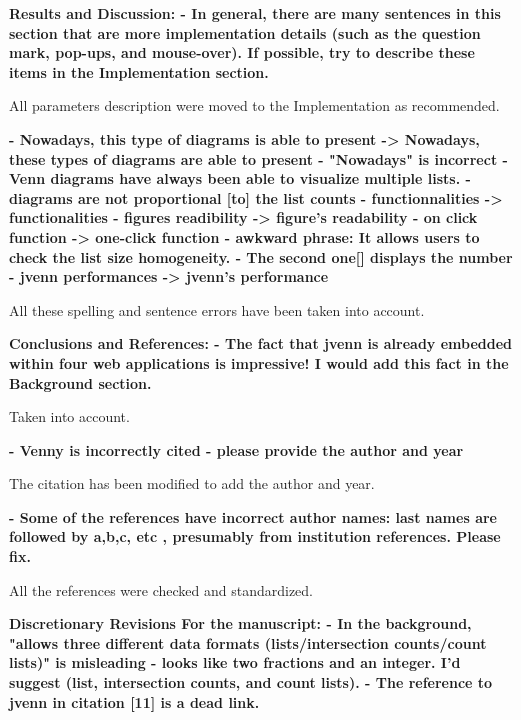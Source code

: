 \documentclass[10pt,stdletter,dateno,sigleft]{newlfm} %
\begin{document}
\begin{newlfm}
\textbf{Results and Discussion:\newline
- In general, there are many sentences in this section that are more
implementation details (such as the question mark, pop-ups, and
mouse-over). If possible, try to describe these items in the
Implementation section.}

All parameters description were moved to the Implementation as recommended.

\textbf{- Nowadays, this type of diagrams is able to present -> Nowadays,
these types of diagrams are able to present\newline
- "Nowadays" is incorrect - Venn diagrams have always been
able to visualize multiple lists.\newline
- diagrams are not proportional [to] the list counts\newline
- functionnalities -> functionalities\newline
- figures readibility -> figure's readability\newline
- on click function -> one-click function\newline
- awkward phrase: It allows users to check the list size homogeneity.\newline
- The second one[] displays the number\newline
- jvenn performances -> jvenn's performance\newline}

All these spelling and sentence errors have been taken into account.

\textbf{Conclusions and References:\newline
- The fact that jvenn is already embedded within four web applications
is impressive! I would add this fact in the Background section.}

Taken into account.

\textbf{- Venny is incorrectly cited - please provide the author and year}

The citation has been modified to add the author and year.

\textbf{- Some of the references have incorrect author names: last names are
followed by a,b,c, etc , presumably from institution references. Please fix.}

All the references were checked and standardized.

\textbf{Discretionary Revisions
For the manuscript:
- In the background, "allows three different data formats
(lists/intersection counts/count lists)" is misleading - looks like
two fractions and an integer. I'd suggest (list, intersection counts,
and count lists).
- The reference to jvenn in citation [11] is a dead link.}


\end{newlfm}
\end{document}
